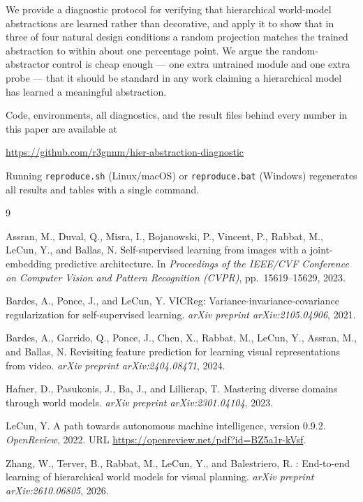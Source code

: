 \documentclass[11pt]{article}
\newcommand{\RepoURL}{https://github.com/r3gnnm/hier-abstraction-diagnostic}
\begin{document}
We provide a diagnostic protocol for verifying that hierarchical world-model abstractions are learned rather than decorative, and apply it to show that in three of four natural design conditions a random projection matches the trained abstraction to within about one percentage point. We argue the random-abstractor control is cheap enough --- one extra untrained module and one extra probe --- that it should be standard in any work claiming a hierarchical model has learned a meaningful abstraction.

Code, environments, all diagnostics, and the result files behind every number in this paper are available at
\begin{center}\url{\RepoURL}\end{center}
Running \texttt{reproduce.sh} (Linux/macOS) or \texttt{reproduce.bat} (Windows) regenerates all results and tables with a single command.


\begin{thebibliography}{9}

Assran, M., Duval, Q., Misra, I., Bojanowski, P., Vincent, P., Rabbat, M., LeCun, Y., and Ballas, N.
\newblock Self-supervised learning from images with a joint-embedding predictive architecture.
\newblock In \emph{Proceedings of the IEEE/CVF Conference on Computer Vision and Pattern Recognition (CVPR)}, pp.\ 15619--15629, 2023.

Bardes, A., Ponce, J., and LeCun, Y.
\newblock VICReg: Variance-invariance-covariance regularization for self-supervised learning.
\newblock \emph{arXiv preprint arXiv:2105.04906}, 2021.

Bardes, A., Garrido, Q., Ponce, J., Chen, X., Rabbat, M., LeCun, Y., Assran, M., and Ballas, N.
\newblock Revisiting feature prediction for learning visual representations from video.
\newblock \emph{arXiv preprint arXiv:2404.08471}, 2024.

Hafner, D., Pasukonis, J., Ba, J., and Lillicrap, T.
\newblock Mastering diverse domains through world models.
\newblock \emph{arXiv preprint arXiv:2301.04104}, 2023.

LeCun, Y.
\newblock A path towards autonomous machine intelligence, version 0.9.2.
\newblock \emph{OpenReview}, 2022.
\newblock URL \url{https://openreview.net/pdf?id=BZ5a1r-kVsf}.

Zhang, W., Terver, B., Rabbat, M., LeCun, Y., and Balestriero, R.
: End-to-end learning of hierarchical world models for visual planning.
\newblock \emph{arXiv preprint arXiv:2610.06805}, 2026.

\end{thebibliography}
\end{document}
